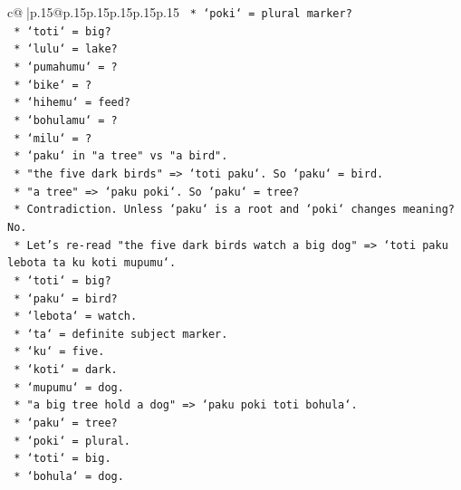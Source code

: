 \documentclass{article}
\begin{document}
{\begin{supertabular}{c@{$\;$}|p{.15\linewidth}@{}p{.15\linewidth}p{.15\linewidth}p{.15\linewidth}p{.15\linewidth}p{.15\linewidth}}
{{{\texttt{                    *   `poki` = plural marker?} \\
\texttt{                    *   `toti` = big?} \\
\texttt{                    *   `lulu` = lake?} \\
\texttt{                    *   `pumahumu` = ?} \\
\texttt{                    *   `bike` = ?} \\
\texttt{                    *   `hihemu` = feed?} \\
\texttt{                    *   `bohulamu` = ?} \\
\texttt{                    *   `milu` = ?} \\
\texttt{                    *   `paku` in "a tree" vs "a bird".} \\
\texttt{                        *   "the five dark birds" => `toti paku`. So `paku` = bird.} \\
\texttt{                        *   "a tree" => `paku poki`. So `paku` = tree?} \\
\texttt{                        *   Contradiction. Unless `paku` is a root and `poki` changes meaning? No.} \\
\texttt{                        *   Let's re{-}read "the five dark birds watch a big dog" => `toti paku lebota ta ku koti mupumu`.} \\
\texttt{                            *   `toti` = big?} \\
\texttt{                            *   `paku` = bird?} \\
\texttt{                            *   `lebota` = watch.} \\
\texttt{                            *   `ta` = definite subject marker.} \\
\texttt{                            *   `ku` = five.} \\
\texttt{                            *   `koti` = dark.} \\
\texttt{                            *   `mupumu` = dog.} \\
\texttt{                        *   "a big tree hold a dog" => `paku poki toti bohula`.} \\
\texttt{                            *   `paku` = tree?} \\
\texttt{                            *   `poki` = plural.} \\
\texttt{                            *   `toti` = big.} \\
\texttt{                            *   `bohula` = dog.} \\
}}}
\end{supertabular}}
\end{document}
